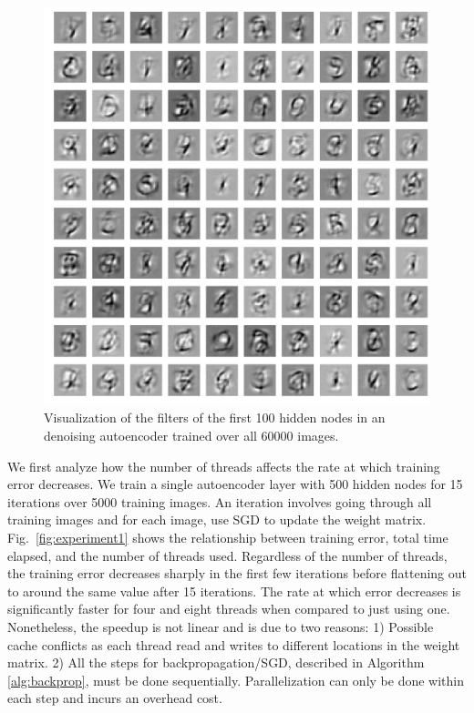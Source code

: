 \documentclass[conference]{IEEEtran}
\begin{document}
\begin{figure}[h]
\centering
\includegraphics[width=1.0\linewidth]{experiment3_1.png}
\caption{Visualization of the filters of the first 100 hidden nodes in an denoising autoencoder trained over all 60000 images.}
\label{fig:experiment3_1}
\end{figure}

We first analyze how the number of threads affects the rate at which training error decreases. We train a single autoencoder layer with 500 hidden nodes for 15 iterations over 5000 training images. An iteration involves going through all training images and for each image, use SGD to update the weight matrix. Fig.~\ref{fig:experiment1} shows the relationship between training error, total time elapsed, and the number of threads used. Regardless of the number of threads, the training error decreases sharply in the first few iterations before flattening out to around the same value after 15 iterations. The rate at which error decreases is significantly faster for four and eight threads when compared to just using one. Nonetheless, the speedup is not linear and is due to two reasons: 1) Possible cache conflicts as each thread read and writes to different locations in the weight matrix. 2) All the steps for backpropagation/SGD, described in Algorithm \ref{alg:backprop}, must be done sequentially. Parallelization can only be done within each step and incurs an overhead cost.
\end{document}
